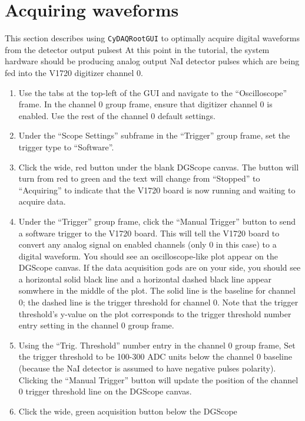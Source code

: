 \section{Acquiring waveforms}
\label{sec:acquiriing1}
This section describes using \texttt{CyDAQRootGUI} to optimally
acquire digital waveforms from the detector output pulsest At this
point in the tutorial, the \ADAQ system hardware should be producing
analog output NaI detector pulses which are being fed into the V1720
digitizer channel 0.

\begin{enumerate}
  \item{Use the tabs at the top-left of the GUI and navigate to the
    ``Oscilloscope'' frame. In the channel 0 group frame, ensure that
    digitizer channel 0 is enabled. Use the rest of the channel 0
    default settings.}
  \item{Under the ``Scope Settings'' subframe in the ``Trigger'' group
    frame, set the trigger type to ``Software''.}
  \item{Click the wide, red button under the blank DGScope canvas. The
    button will turn from red to green and the text will change from
    ``Stopped'' to ``Acquiring'' to indicate that the V1720 board is
    now running and waiting to acquire data.}
  \item{Under the ``Trigger'' group frame, click the ``Manual
    Trigger'' button to send a software trigger to the V1720
    board. This will tell the V1720 board to convert any analog signal
    on enabled channels (only 0 in this case) to a digital
    waveform. You should see an oscilloscope-like plot appear on the
    DGScope canvas. If the data acquisition gods are on your side, you
    should see a horizontal solid black line and a horizontal dashed
    black line appear somwhere in the middle of the plot. The solid
    line is the baseline for channel 0; the dashed line is the trigger
    threshold for channel 0. Note that the trigger threshold's y-value
    on the plot corresponds to the trigger threshold number entry
    setting in the channel 0 group frame.}
  \item{Using the ``Trig. Threshold'' number entry in the channel 0
    group frame, Set the trigger threshold to be 100-300 ADC units
    below the channel 0 baseline (because the NaI detector is assumed
    to have negative pulses polarity). Clicking the ``Manual Trigger''
    button will update the position of the channel 0 trigger threshold
    line on the DGScope canvas.}
  \item{Click the wide, green acquisition button below the DGScope
}
\end{enumerate}
